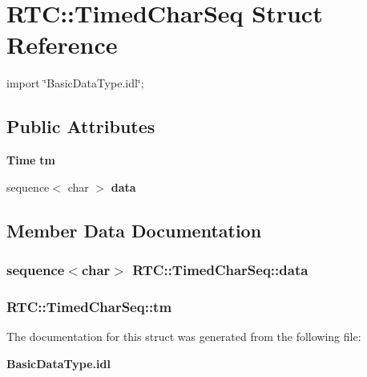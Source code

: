 \section{RTC::TimedCharSeq Struct Reference}
\label{structRTC_1_1TimedCharSeq}


{\ttfamily import \char`\"{}BasicDataType.idl\char`\"{};}

\subsection*{Public Attributes}
\begin{DoxyCompactItemize}
\item 
{\bf Time} {\bf tm}
\item 
sequence$<$ char $>$ {\bf data}
\end{DoxyCompactItemize}


\subsection{Member Data Documentation}
\subsubsection[{data}]{\setlength{\rightskip}{0pt plus 5cm}sequence$<$char$>$ {\bf RTC::TimedCharSeq::data}}\label{structRTC_1_1TimedCharSeq_a56ac1b4edf9feed206c4f5dac3f39a76}
\subsubsection[{tm}]{ {\bf RTC::TimedCharSeq::tm}}\label{structRTC_1_1TimedCharSeq_adf1cef916575772777ad789c69311a2c}


The documentation for this struct was generated from the following file:\begin{DoxyCompactItemize}
\item 
{\bf BasicDataType.idl}\end{DoxyCompactItemize}
